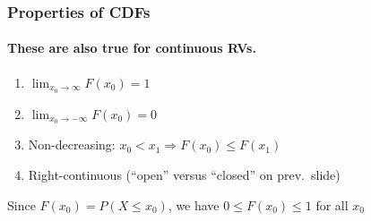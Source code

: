 
\begin{frame}
\frametitle{Properties of CDFs}
\framesubtitle{These are also true for continuous RVs.}
	\begin{enumerate}
		\item $\lim_{x_0 \rightarrow \infty} F(x_0) = 1$
		\item $\lim_{x_0 \rightarrow -\infty} F(x_0) = 0$
		\item Non-decreasing: $x_0 < x_1 \Rightarrow F(x_0)\leq F(x_1)$
		\item Right-continuous (``open'' versus ``closed'' on prev.\ slide)
	\end{enumerate}
	
	
	 
	
	
\vspace{1em}
\begin{alertblock}{Since $F(x_0) = P(X\leq x_0)$,  we have $0\leq F(x_0)\leq 1$ for all $x_0$}\end{alertblock}
\end{frame}

